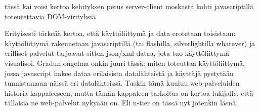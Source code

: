 tässä kai voisi kertoa kehityksen perus server-client moskasta kohti javascriptillä toteutettavia DOM-virityksiä

Erityisesti tärkeää kertoa, että käyttöliittymä ja data erotetaan toisistaan: käyttöliittymä rakennetaan javascriptillä (tai flashilla, silverlightilla whatever) ja erilliset palvelut tarjoavat sitten json/xml-dataa, jota tuo käyttöliittymä visualisoi. Gradun ongelma onkin juuri tässä: miten toteuttaa käyttöliittymä, jossa javascript hakee dataa erilaisista datalähteistä ja käyttäjä pystytään tunnistamaan näissä eri datalähteissä. Tuskin tämä kuuluu web-palveluiden historia-kappaleeseen, mutta tämän kappaleen tarkoitus on kertoa lukijalle, että tällaisia ne web-palvelut nykyään on. Eli n-tier on tässä nyt jotenkin läsnä.